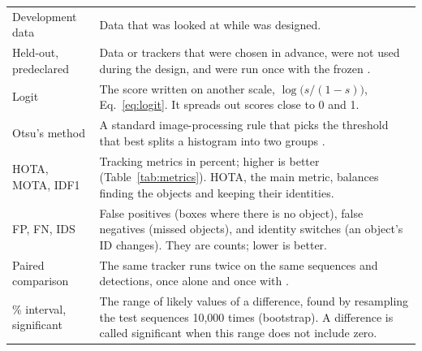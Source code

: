 \begin{table}[t]
\begin{tabular}{@{}>{\raggedright\arraybackslash}p{32mm}>{\raggedright\arraybackslash}p{123mm}@{}}
Development data & Data that was looked at while \scl{} was designed.\\
Held-out, predeclared & Data or trackers that were chosen in advance, were not used during the design, and were run once with the frozen \scl{}.\\
Logit & The score written on another scale, $\log\bigl(s/(1-s)\bigr)$, Eq.~\eqref{eq:logit}. It spreads out scores close to 0 and 1.\\
Otsu's method & A standard image-processing rule that picks the threshold that best splits a histogram into two groups \cite{otsu1979}.\\
HOTA, MOTA, IDF1 & Tracking metrics in percent; higher is better (Table~\ref{tab:metrics}). HOTA, the main metric, balances finding the objects and keeping their identities.\\
FP, FN, IDS & False positives (boxes where there is no object), false negatives (missed objects), and identity switches (an object's ID changes). They are counts; lower is better.\\
Paired comparison & The same tracker runs twice on the same sequences and detections, once alone and once with \scl{}.\\
95\% interval, significant & The range of likely values of a difference, found by resampling the test sequences 10,000 times (bootstrap). A difference is called significant when this range does not include zero.\\
\bottomrule
\end{tabular}
\end{table}
